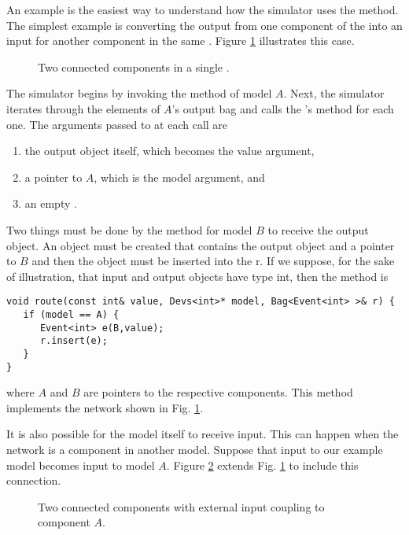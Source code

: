An example is the easiest way to understand how the simulator uses the  method. The simplest example is converting the output from one  component of the  into an input for another  component in the same . Figure \ref{fig:atomic_to_atomic_coupling} illustrates this case. 
\begin{figure}[ht]
\centering
{}
\caption{Two connected  components in a single .}
\label{fig:atomic_to_atomic_coupling}
\end{figure} 

The simulator begins by invoking the  method of  model $A$. Next, the simulator iterates through the elements of $A$'s output bag and calls the 's  method for each one. The arguments passed to  at each call are
\begin{enumerate}
\item the output object itself, which becomes the value argument,
\item a pointer to $A$, which is the model argument, and
\item an empty .
\end{enumerate} 
Two things must be done by the  method for  model $B$ to receive the output object. An  object must be created that contains the output object and a pointer to $B$ and then the  object must be inserted into the  r. If we suppose, for the sake of illustration, that input and output objects have type int, then the  method is
\begin{verbatim}
void route(const int& value, Devs<int>* model, Bag<Event<int> >& r) {
   if (model == A) {
      Event<int> e(B,value);
      r.insert(e);
   }
}
\end{verbatim}
where $A$ and $B$ are pointers to the respective components. This  method implements the network shown in Fig. \ref{fig:atomic_to_atomic_coupling}.

It is also possible for the  model itself to receive input. This can happen when the network is a component in another  model. Suppose that input to our example  model becomes input to  model $A$. Figure \ref{fig:eic_atomic_to_atomic_coupling} extends Fig. \ref{fig:atomic_to_atomic_coupling} to include this connection.
\begin{figure}[ht]
\centering
{}
\caption{Two connected  components with external input coupling to component $A$.}
\label{fig:eic_atomic_to_atomic_coupling}
\end{figure} 

